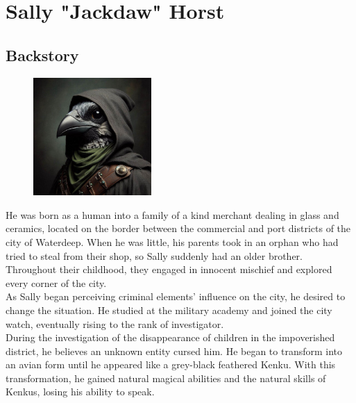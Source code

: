 \documentclass[10pt,onecolumn,twoside,openany,bg=full,layout=true]{dndbook}
\begin{document}
\vfill
\pagebreak


  \section{Sally "Jackdaw" Horst}\label{sec:sally-jackdaw-horst}
  \subsection{Backstory}\label{subsec:sally-backstory}
  \begin{figure}
    \begin{center}
      \includegraphics[width=0.4\textwidth]{img/sally}
      \vspace{1cm}
    \end{center}
  \end{figure}

He was born as a human into a family of a kind merchant dealing in glass and ceramics, located on the border between the
commercial and port districts of the city of Waterdeep.
When he was little, his parents took in an orphan who had tried to steal from their shop, so Sally suddenly had an
older brother.
Throughout their childhood, they engaged in innocent mischief and explored every corner of the city.\\

As Sally began perceiving criminal elements' influence on the city, he desired to change the situation.
He studied at the military academy and joined the city watch, eventually rising to the rank of investigator.\\

During the investigation of the disappearance of children in the impoverished district, he believes an unknown entity
cursed him.
He began to transform into an avian form until he appeared like a grey-black feathered Kenku.
With this transformation, he gained natural magical abilities and the natural skills of Kenkus, losing his ability
to speak.\\
\end{document}
